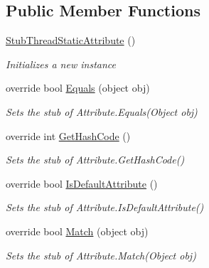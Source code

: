 \subsection*{Public Member Functions}
\begin{DoxyCompactItemize}
\item 
\hyperlink{class_system_1_1_fakes_1_1_stub_thread_static_attribute_a4884eaa670b21b5b6f05ba0ac9fc49db}{Stub\-Thread\-Static\-Attribute} ()
\begin{DoxyCompactList}\small\item\em Initializes a new instance\end{DoxyCompactList}\item 
override bool \hyperlink{class_system_1_1_fakes_1_1_stub_thread_static_attribute_ae2f010f4f9d14c45cb03de3db667d0db}{Equals} (object obj)
\begin{DoxyCompactList}\small\item\em Sets the stub of Attribute.\-Equals(\-Object obj)\end{DoxyCompactList}\item 
override int \hyperlink{class_system_1_1_fakes_1_1_stub_thread_static_attribute_ae1cd72303b9dc3c3b2338c46372e8df2}{Get\-Hash\-Code} ()
\begin{DoxyCompactList}\small\item\em Sets the stub of Attribute.\-Get\-Hash\-Code()\end{DoxyCompactList}\item 
override bool \hyperlink{class_system_1_1_fakes_1_1_stub_thread_static_attribute_ad00130fc1f089c73e7e0b94cfe3f5af0}{Is\-Default\-Attribute} ()
\begin{DoxyCompactList}\small\item\em Sets the stub of Attribute.\-Is\-Default\-Attribute()\end{DoxyCompactList}\item 
override bool \hyperlink{class_system_1_1_fakes_1_1_stub_thread_static_attribute_a6409dd437447aecacb74fc560197b98b}{Match} (object obj)
\begin{DoxyCompactList}\small\item\em Sets the stub of Attribute.\-Match(\-Object obj)\end{DoxyCompactList}\end{DoxyCompactItemize}
